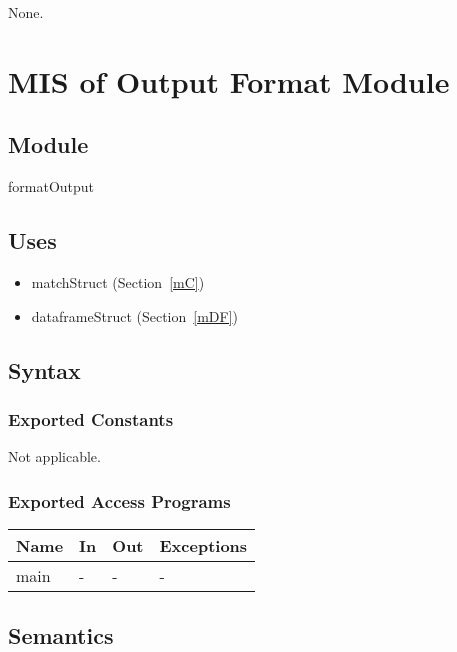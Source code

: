 \documentclass[12pt, titlepage]{article}
\begin{document}
None.

  \section{MIS of Output Format Module} \label{mOF}



\subsection{Module}

formatOutput

\subsection{Uses}
\begin{itemize}
\item matchStruct (Section~\ref{mC})
\item dataframeStruct (Section~\ref{mDF})
\end{itemize}

\subsection{Syntax}

\subsubsection{Exported Constants}
Not applicable.
\subsubsection{Exported Access Programs}

\begin{center}
\begin{tabular}{p{2cm} p{4cm} p{4cm} p{2cm}}
\hline
\textbf{Name} & \textbf{In} & \textbf{Out} & \textbf{Exceptions} \\
\hline
main & - & - & - \\
\hline
\end{tabular}
\end{center}

\subsection{Semantics}
\end{document}
